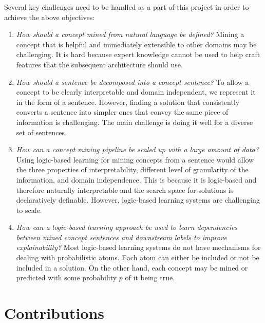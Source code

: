 Several key challenges need to be handled as a part of this project in order to achieve the above objectives:
\begin{enumerate}
    \item \emph{How should a concept mined from natural language be defined?} Mining a concept that is helpful and immediately extensible to other domains may be challenging. It is hard because expert knowledge cannot be used to help craft features that the subsequent architecture should use.
    
    \item \emph{How should a sentence be decomposed into a concept sentence?} To allow a concept to be clearly interpretable and domain independent, we represent it in the form of a sentence.
    However, finding a solution that consistently converts a sentence into simpler ones that convey the same piece of information is challenging. 
    The main challenge is doing it well for a diverse set of sentences.
    
    \item \emph{How can a concept mining pipeline be scaled up with a large amount of data?} 
    Using logic-based learning for mining concepts from a sentence would allow the three properties of interpretability, different level of granularity of the information, and domain independence. 
    This is because it is logic-based and therefore naturally interpretable and the search space for solutions is declaratively definable.
    However, logic-based learning systems are challenging to scale.
    
    \item \emph{How can a logic-based learning approach be used to learn dependencies between mined concept sentences and downstream labels to improve explainability?} Most logic-based learning systems do not have mechanisms for dealing with probabilistic atoms.
    Each atom can either be included or not be included in a solution.
    On the other hand, each concept may be mined or predicted with some probability $p$ of it being true.
\end{enumerate}

 
\section{Contributions}


